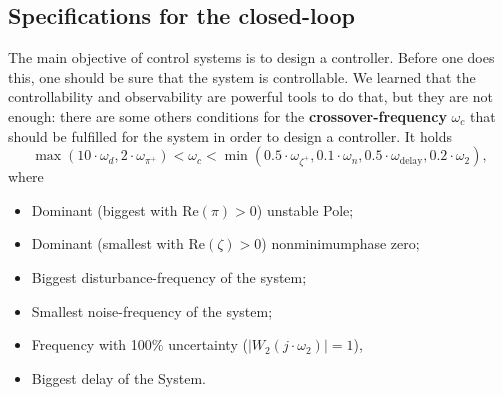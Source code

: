 \documentclass[a4paper,12 pt]{article}
\numberwithin{equation}{section}
\theoremstyle{definition}
\theoremstyle{remark}
\theoremstyle{definition}
\theoremstyle{definition}
\theoremstyle{definition}
\theoremstyle{remark}
\begin{document}
\subsection{Specifications for the closed-loop}
The main objective of control systems is to design a controller. Before one does this, one should be sure that the system is controllable. We learned that the controllability and observability are powerful tools to do that, but they are not enough: there are some others conditions for the \textbf{crossover-frequency} $\omega_c$ that should be fulfilled for the system in order to design a controller. It holds
\begin{equation}
\max(10\cdot \omega_d,2\cdot \omega_{\pi^+})<\omega_c<\min(0.5\cdot \omega_{\zeta^+},0.1\cdot \omega_n,0.5\cdot \omega_{\text{delay}},0.2\cdot \omega_2),
\end{equation}
where
\begin{itemize}
\item {} Dominant (biggest with $\text{Re}(\pi)>0$) unstable Pole;
\item{} Dominant (smallest with $\text{Re}(\zeta)>0$) nonminimumphase zero;
\item{} Biggest disturbance-frequency of the system;
\item{} Smallest noise-frequency of the system;
\item{} Frequency with 100\% uncertainty ($|W_2(j\cdot \omega_2)|=1$),
\item{} Biggest delay of the System.
\end{itemize}
\newpage
\end{document}
